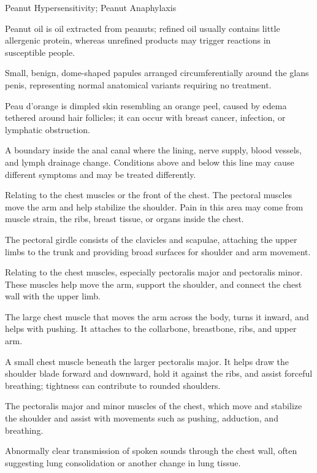\synonyms
Peanut Hypersensitivity; Peanut Anaphylaxis

 Peanut oil is oil extracted from peanuts; refined oil usually contains little allergenic protein, whereas unrefined products may trigger reactions in susceptible people.

 Small, benign, dome-shaped papules arranged circumferentially around the glans penis,
representing normal anatomical variants requiring no treatment.

 Peau d’orange is dimpled skin resembling an orange peel, caused by edema tethered around hair follicles; it can occur with breast cancer, infection, or lymphatic obstruction.

 A boundary inside the anal canal where the lining, nerve supply, blood vessels, and lymph drainage change. Conditions above and below this line may cause different symptoms and may be treated differently.

 Relating to the chest muscles or the front of the chest. The pectoral muscles move the arm and help stabilize the shoulder. Pain in this area may come from muscle strain, the ribs, breast tissue, or organs inside the chest.

 The pectoral girdle consists of the clavicles and scapulae, attaching the upper limbs to the trunk and providing broad surfaces for shoulder and arm movement.

 Relating to the chest muscles, especially pectoralis major and pectoralis minor. These muscles help move the arm, support the shoulder, and connect the chest wall with the upper limb.

 The large chest muscle that moves the arm across the body, turns it inward, and helps with pushing. It attaches to the collarbone, breastbone, ribs, and upper arm.

 A small chest muscle beneath the larger pectoralis major. It helps draw the shoulder blade forward and downward, hold it against the ribs, and assist forceful breathing; tightness can contribute to rounded shoulders.

 The pectoralis major and minor muscles of the chest, which move and stabilize the shoulder and assist with movements such as pushing, adduction, and breathing.

 Abnormally clear transmission of spoken sounds through the chest wall, often suggesting lung consolidation or another change in lung tissue.

